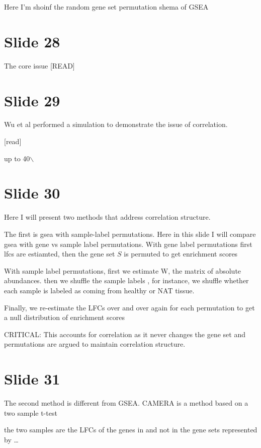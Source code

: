\documentclass[11pt]{article}
\begin{document}
Here I'm shoinf the random gene set permutation shema of GSEA

\section{Slide 28}
\label{sec:org6183076}

The core issue [READ]

\section{Slide 29}
\label{sec:org23bd83d}

Wu et al performed a simulation to demonstrate the issue of correlation.

[read]

up to 40$\backslash$%

\section{Slide 30}
\label{sec:org16efe5a}

Here I will present two methods that address correlation structure.

The first is gsea with sample-label permutations. Here in this slide I will compare gsea with gene vs sample label
permutations. With gene label permutations first lfcs are estiamted, then the gene set \(S\) is permuted to get enrichment scores

With sample label permutations, first we estimate W, the matrix of absolute abundances. then we shuffle the sample labels
, for instance, we shuffle whether each sample is labeled as coming from healthy or NAT tissue.

Finally, we re-estimate the LFCs over and over again for each permutation to get a null distribution of enrichment scores

CRITICAL: This accounts for correlation as it never changes the gene set and permutations are argued to maintain correlation
structure.

\section{Slide 31}
\label{sec:org34b85bf}

The second method is different from GSEA. CAMERA is a method based on a two sample t-test

the two samples are the LFCs of the genes in and not in the gene sets represented by \ldots{}
\end{document}
